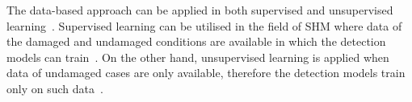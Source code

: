 The data-based approach can be applied in both supervised and unsupervised learning~\cite{worden2007application}.
Supervised learning can be utilised in the field of SHM where data of the damaged and undamaged conditions are available in which the detection models can train~\cite{figueiredo2018machine}.
On the other hand, unsupervised learning is applied when data of undamaged cases are only available, therefore the detection models train only on such data~\cite{figueiredo2018machine}.






%
%